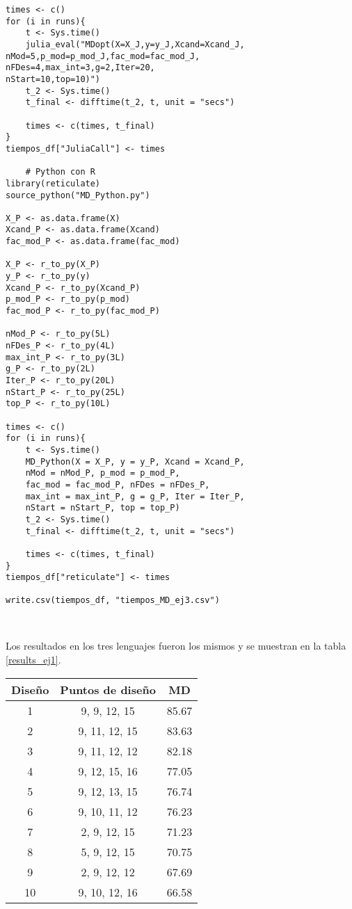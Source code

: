 \begin{verbatim}
times <- c()
for (i in runs){
	t <- Sys.time()
	julia_eval("MDopt(X=X_J,y=y_J,Xcand=Xcand_J, 
nMod=5,p_mod=p_mod_J,fac_mod=fac_mod_J, 
nFDes=4,max_int=3,g=2,Iter=20, 
nStart=10,top=10)")
	t_2 <- Sys.time()
	t_final <- difftime(t_2, t, unit = "secs")
		
	times <- c(times, t_final)
}
tiempos_df["JuliaCall"] <- times
	
	# Python con R
library(reticulate)
source_python("MD_Python.py")
	
X_P <- as.data.frame(X)
Xcand_P <- as.data.frame(Xcand)
fac_mod_P <- as.data.frame(fac_mod)
	
X_P <- r_to_py(X_P)
y_P <- r_to_py(y) 
Xcand_P <- r_to_py(Xcand_P)
p_mod_P <- r_to_py(p_mod)
fac_mod_P <- r_to_py(fac_mod_P)
	
nMod_P <- r_to_py(5L)
nFDes_P <- r_to_py(4L)
max_int_P <- r_to_py(3L)
g_P <- r_to_py(2L)
Iter_P <- r_to_py(20L)
nStart_P <- r_to_py(25L)
top_P <- r_to_py(10L)
	
times <- c()
for (i in runs){
	t <- Sys.time()
	MD_Python(X = X_P, y = y_P, Xcand = Xcand_P, 
	nMod = nMod_P, p_mod = p_mod_P, 
	fac_mod = fac_mod_P, nFDes = nFDes_P,
	max_int = max_int_P, g = g_P, Iter = Iter_P, 
	nStart = nStart_P, top = top_P)
	t_2 <- Sys.time()
	t_final <- difftime(t_2, t, unit = "secs")
		
	times <- c(times, t_final)
}
tiempos_df["reticulate"] <- times

write.csv(tiempos_df, "tiempos_MD_ej3.csv")
	
	
\end{verbatim}

Los resultados en los tres lenguajes fueron los mismos y se muestran en la tabla \ref{results_ej1}. 

\begin{center}
	\begin{tabular}{cc|c}
		Diseño & Puntos de diseño & MD \\
		\hline
		1 & 9, 9, 12, 15 & 85.67 \\
		
		2 & 9, 11, 12, 15 & 83.63 \\
		
		3 &  9, 11, 12, 12 & 82.18 \\
		
		4 & 9, 12, 15, 16 & 77.05 \\
		
		5 & 9, 12, 13, 15 & 76.74 \\
		
		6 & 9, 10, 11, 12 & 76.23 \\
		
		7 & 2, 9, 12, 15 & 71.23 \\
		
		8 & 5, 9, 12, 15 & 70.75 \\
		
		9 & 2, 9, 12, 12 & 67.69 \\
		
		10 & 9, 10, 12, 16 & 66.58 \\
		
	\end{tabular}
	 \label{results_ej1}
\end{center}

